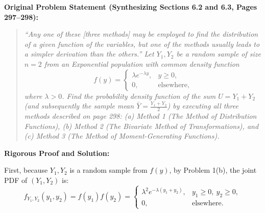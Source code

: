 \documentclass[11pt, letterpaper]{article}
\theoremstyle{definition}
\theoremstyle{remark}
\begin{document}
\textbf{Original Problem Statement (Synthesizing Sections 6.2 and 6.3, Pages 297--298):}
\begin{quote}
\textit{``Any one of these [three methods] may be employed to find the distribution of a given function of the variables, but one of the methods usually leads to a simpler derivation than the others.'' Let $Y_1, Y_2$ be a random sample of size $n = 2$ from an Exponential population with common density function}
\[
    f(y) = \begin{cases}
        \lambda e^{-\lambda y}, & y \ge 0, \\
        0, & \text{elsewhere,}
    \end{cases}
\]
\textit{where $\lambda > 0$. Find the probability density function of the sum $U = Y_1 + Y_2$ (and subsequently the sample mean $\bar{Y} = \frac{Y_1 + Y_2}{2}$) by executing all three methods described on page 298: (a) Method 1 (The Method of Distribution Functions), (b) Method 2 (The Bivariate Method of Transformations), and (c) Method 3 (The Method of Moment-Generating Functions).}
\end{quote}

\hr
\textbf{Rigorous Proof and Solution:}

First, because $Y_1, Y_2$ is a random sample from $f(y)$, by Problem 1(b), the joint PDF of $(Y_1, Y_2)$ is:
\[
    f_{Y_1, Y_2}(y_1, y_2) = f(y_1)f(y_2) = \begin{cases}
        \lambda^2 e^{-\lambda(y_1 + y_2)}, & y_1 \ge 0, \ y_2 \ge 0, \\
        0, & \text{elsewhere.}
    \end{cases}
\]
\end{document}
